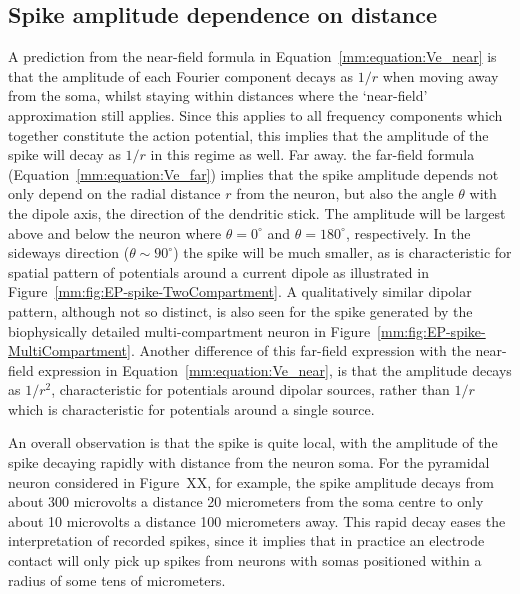 \subsection{Spike amplitude dependence on distance}
A prediction from the near-field formula in Equation~\ref{mm:equation:Ve_near} is that the amplitude of each Fourier component decays
as $1/r$ when moving away from the soma, whilst staying within distances where the `near-field' approximation still applies.
Since this applies to all frequency components which together constitute the action potential, this implies that the amplitude of the 
spike will decay as $1/r$ in this regime as well. 
Far away. the far-field formula (Equation~\ref{mm:equation:Ve_far}) implies that the spike amplitude depends not only depend on the radial distance $r$ from the neuron,
but also the angle $\theta$ with the dipole axis, the direction of the dendritic stick. The amplitude will be largest
above and below the neuron where $\theta=0^\circ$ and $\theta=180^\circ$, respectively. In the sideways direction 
($\theta \sim 90^\circ$) the spike will be much smaller, as is characteristic for spatial pattern of potentials around a current
dipole as illustrated in Figure~\ref{mm:fig:EP-spike-TwoCompartment}. A qualitatively similar dipolar pattern, although not so distinct,
is also seen for the spike generated by the biophysically detailed multi-compartment neuron in Figure~\ref{mm:fig:EP-spike-MultiCompartment}.
Another difference of this far-field expression with the near-field expression in Equation~\ref{mm:equation:Ve_near}, is that the
amplitude decays as $1/r^2$, characteristic for potentials around dipolar sources, rather than $1/r$ which is characteristic for potentials around 
a single source. %

An overall observation is that the spike is quite local, with the amplitude of the spike decaying rapidly with distance from the neuron soma. 
For the pyramidal neuron considered in Figure~XX, for example, the spike amplitude decays from about
300 microvolts a distance 20 micrometers from the soma centre to only about 10 microvolts a
distance 100 micrometers away. 
%
%
This rapid decay eases the interpretation of recorded spikes, since it implies
that in practice an electrode contact will only pick up spikes from neurons with somas positioned within a radius of some tens of micrometers.


